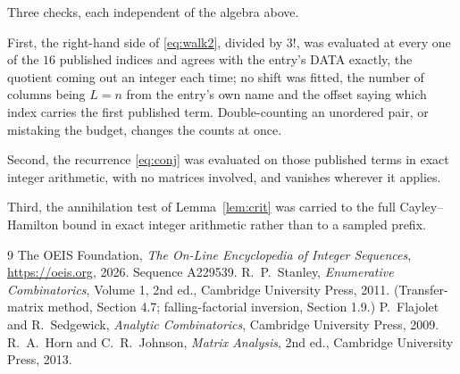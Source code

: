 \documentclass[11pt,a4paper]{article}
\theoremstyle{plain}
\theoremstyle{definition}
\begin{document}
Three checks, each independent of the algebra above.

First, the right-hand side of \eqref{eq:walk2}, divided by $3!$, was evaluated at every
one of the $16$ published indices and agrees with the entry's DATA exactly, the quotient
coming out an integer each time; no shift was fitted, the number of columns being $L=n$
from the entry's own name and the offset saying which index carries the first published term.
Double-counting an unordered pair, or mistaking the budget, changes the counts at once.

Second, the recurrence \eqref{eq:conj} was evaluated on those published terms in exact
integer arithmetic, with no matrices involved, and vanishes wherever it applies.

Third, the annihilation test of Lemma~\ref{lem:crit} was carried to the full
Cayley--Hamilton bound in exact integer arithmetic rather than to a sampled prefix.

\begin{thebibliography}{9}
 The OEIS Foundation, \emph{The On-Line Encyclopedia of Integer
Sequences}, \url{https://oeis.org}, 2026. Sequence A229539.
 R.~P.~Stanley, \emph{Enumerative Combinatorics}, Volume 1, 2nd ed.,
Cambridge University Press, 2011. (Transfer-matrix method, Section 4.7; falling-factorial
inversion, Section 1.9.)
 P.~Flajolet and R.~Sedgewick, \emph{Analytic Combinatorics}, Cambridge
University Press, 2009.
 R.~A.~Horn and C.~R.~Johnson, \emph{Matrix Analysis}, 2nd ed., Cambridge
University Press, 2013.
\end{thebibliography}
\end{document}
